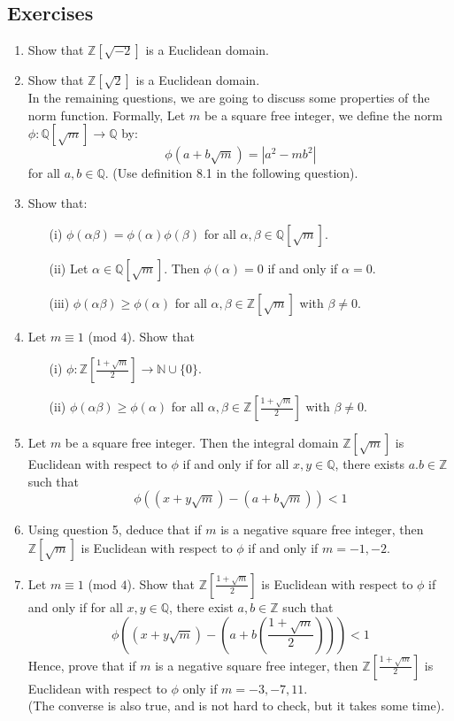 \subsection{Exercises}
\begin{enumerate}
\item Show that $\mathbb{Z}[\sqrt{-2}]$ is a Euclidean domain.
\item Show that $\mathbb{Z}[\sqrt{2}]$ is a Euclidean domain.
~\\
In the remaining questions, we are going to discuss some properties of the norm function.
Formally, Let $m$ be a square free integer, we define the norm $\phi: \mathbb{Q}[\sqrt{m}] \rightarrow \mathbb{Q}$ by:
    $$\phi(a+b\sqrt{m})=|a^2-mb^2|$$
    for all $a,b \in \mathbb{Q}$. (Use definition 8.1 in the following question).
\item Show that:
    \begin{enumerate}
    \item[(i)] $\phi(\alpha \beta)=\phi(\alpha)\phi(\beta)$ for all $\alpha,\beta \in \mathbb{Q}[\sqrt{m}]$.
    \item[(ii)] Let $\alpha \in \mathbb{Q}[\sqrt{m}]$. Then $\phi(\alpha)=0$ if and only if $\alpha=0$.
    \item[(iii)] $\phi(\alpha \beta) \ge \phi(\alpha)$ for all $\alpha,\beta \in \mathbb{Z}[\sqrt{m}]$ with $\beta \neq 0$.
    \end{enumerate}
\item Let $m \equiv 1$ (mod $4$). Show that
    \begin{enumerate}
    \item[(i)] $\phi: \mathbb{Z}[\frac{1+\sqrt{m}}{2}] \rightarrow \mathbb{N} \cup \{0\}$.
    \item[(ii)] $\phi(\alpha\beta) \ge \phi(\alpha)$ for all $\alpha,\beta \in \mathbb{Z}[\frac{1+\sqrt{m}}{2}]$ with $\beta \neq 0$.
    \end{enumerate}
\item Let $m$ be a square free integer. Then the integral domain $\mathbb{Z}[\sqrt{m}]$ is Euclidean with respect to $\phi$ if and only if for all $x, y \in \mathbb{Q}$, there exists $a.b \in \mathbb{Z}$ such that
    $$\phi((x+y\sqrt{m})-(a+b\sqrt{m}))<1$$
\item Using question 5, deduce that if $m$ is a negative square free integer, then $\mathbb{Z}[\sqrt{m}]$ is Euclidean with respect to $\phi$ if and only if $m=-1,-2$.
\item Let $m \equiv 1$ (mod $4$). Show that $\mathbb{Z}[\frac{1+\sqrt{m}}{2}]$ is Euclidean with
    respect to $\phi$ if and only if for all $x,y \in \mathbb{Q}$, there exist $a,b \in \mathbb{Z}$ such that
    $$\phi\left((x+y\sqrt{m})-\left(a+b\left(\frac{1+\sqrt{m}}{2}\right)\right)\right)<1$$
    Hence, prove that if $m$ is a negative square free integer, then $\mathbb{Z}[\frac{1+\sqrt{m}}{2}]$ is Euclidean with respect to $\phi$  only if $m=-3,-7,11$.\\
    (The converse is also true, and is not hard to check, but it takes some time).
\end{enumerate}




